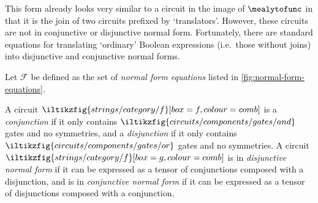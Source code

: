 This form already looks very similar to a circuit in the image of
\(\mealytofunc\) in that it is the join of two circuits prefixed by
`translators'.
However, these circuits are not in conjunctive or disjunctive normal form.
Fortunately, there are standard equations for translating `ordinary' Boolean
expressions (i.e.\ those without joins) into disjunctive and conjunctive normal
forms.

\begin{definition}
    Let \(\mathcal{F}\) be defined as the set of \emph{normal form equations}
    listed in \cref{fig:normal-form-equations}.
\end{definition}



\begin{definition}
    A circuit \(
    \iltikzfig{strings/category/f}[box=f,colour=comb]
    \) is a \emph{conjunction} if it only contains \(
    \iltikzfig{circuits/components/gates/and}
    \) gates and no symmetries, and a \emph{disjunction} if it only contains \(
    \iltikzfig{circuits/components/gates/or}
    \) gates and no symmetries.
    A circuit \(
    \iltikzfig{strings/category/f}[box=g,colour=comb]
    \) is in \emph{disjunctive normal form} if it can be expressed as a
    tensor of conjunctions composed with a disjunction, and is in
    \emph{conjunctive normal form} if it can be expressed as a tensor of
    disjunctions composed with a conjunction.
\end{definition}

